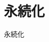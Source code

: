 \documentclass[../../../main]{subfiles}
\begin{document}
    \section{永続化}\label{sec:phraseology-persistence}

    永続化
\end{document}
